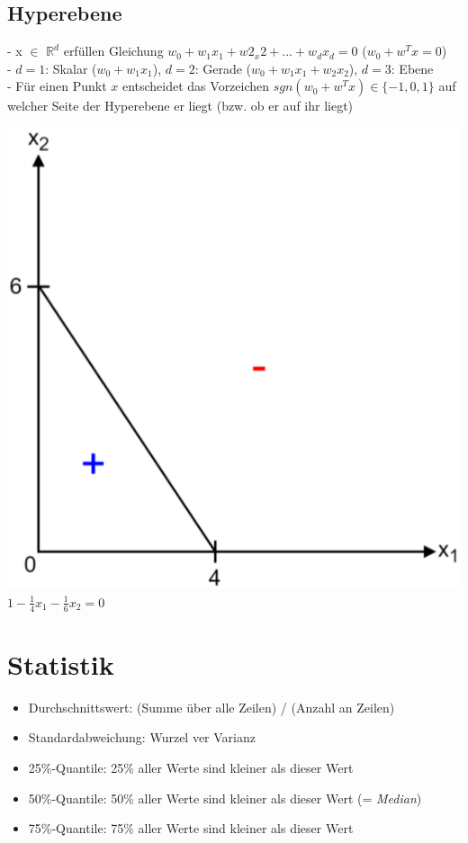 \documentclass{report}
\begin{document}
  \subsection{Hyperebene}	
  - x $\in$ $\mathbb{R}^d$ erfüllen Gleichung $w_0 + w_1x_1 + w2_x2 + ... + w_dx_d = 0$ ($w_0 + w^Tx = 0$)\\	
  - $d = 1$: Skalar ($w_0 + w_1x_1$), $d = 2$: Gerade ($w_0 + w_1x_1 + w_2x_2$), $d = 3$: Ebene\\	
  - Für einen Punkt $x$ entscheidet das Vorzeichen $sgn(w_0 + w^Tx)\in \{-1, 0, 1\}$ auf welcher Seite der Hyperebene er liegt (bzw. ob er auf ihr liegt)\\	
  \begin{center}	
  \includegraphics[scale=.2]{ml01_1} $1 - \frac{1}{4}x_1 - \frac{1}{6}x_2 = 0$	
  \end{center}	
  
  \section{Statistik}	
  \begin{itemize}	
    \item Durchschnittswert: (Summe über alle Zeilen) / (Anzahl an Zeilen)	
    \item Standardabweichung: Wurzel ver Varianz	
    \item 25\%-Quantile: 25\% aller Werte sind kleiner als dieser Wert	
    \item 50\%-Quantile: 50\% aller Werte sind kleiner als dieser Wert (= \textit{Median})	
    \item 75\%-Quantile: 75\% aller Werte sind kleiner als dieser Wert	
  \end{itemize}	
  
\end{document}
